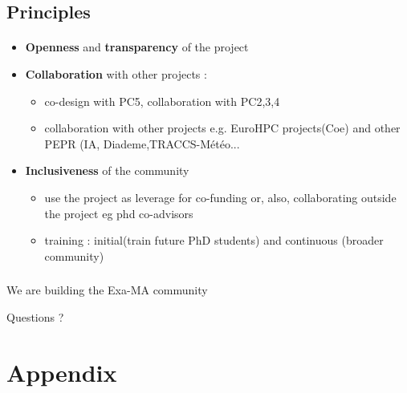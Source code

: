 \subsection{Principles}
\begin{frame}[fragile=singleslide]{\insertsectionhead}
  \framesubtitle{\insertsubsectionhead}

  \begin{itemize}
    \item \textbf{Openness} and \textbf{transparency} of the project 
    \item \textbf{Collaboration} with other projects : 
    \begin{itemize}
      \item 
        co-design with PC5, collaboration with PC2,3,4\
        \item 
          collaboration with other projects e.g. EuroHPC projects(Coe) and other PEPR (IA, Diademe,TRACCS-Météo...
    \end{itemize}
    \item \textbf{Inclusiveness} of the community 
    \begin{itemize}
      \item use the project as leverage for co-funding  or, also, collaborating outside the project eg phd co-advisors
      \item training : initial(train future PhD students) and continuous (broader community)
    \end{itemize}      
  \end{itemize}

\end{frame}


\begin{frame}
  \frametitle{}
  \framesubtitle{}

  \begin{center}
    \LARGE We are building the Exa-MA community 
  \end{center}
  Questions ?
  

\end{frame}

\appendix
\section{Appendix}

